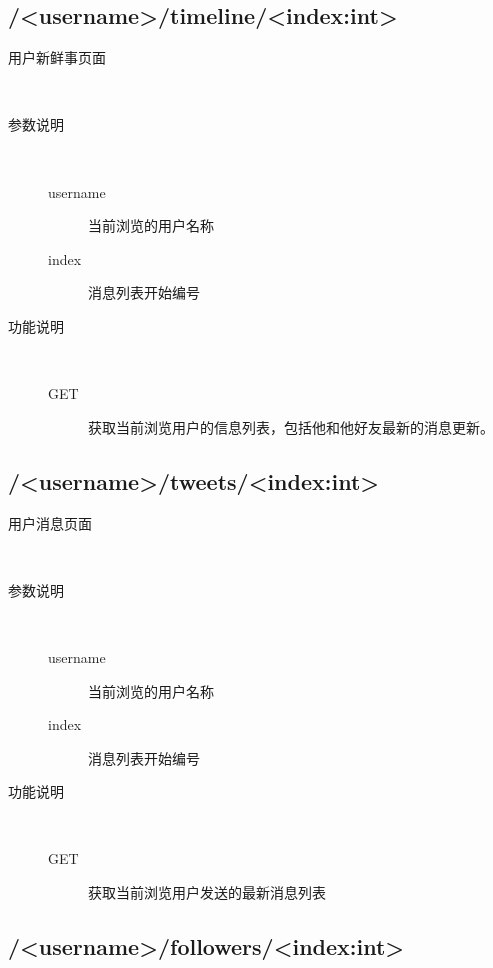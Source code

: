 \documentclass{yaldc}
\begin{document}
\subsection{/<username>/timeline/<index:int>}

\begin{description}
    \item[用户新鲜事页面] ~
    \item[参数说明] ~
        \begin{description}
            \item[username] 当前浏览的用户名称
            \item[index] 消息列表开始编号
        \end{description}
    \item[功能说明] ~
        \begin{description}
            \item[GET] 获取当前浏览用户的信息列表，包括他和他好友最新的消息更新。
        \end{description}
\end{description}

\subsection{/<username>/tweets/<index:int>}

\begin{description}
    \item[用户消息页面] ~
    \item[参数说明] ~
        \begin{description}
            \item[username] 当前浏览的用户名称
            \item[index] 消息列表开始编号
        \end{description}
    \item[功能说明] ~
        \begin{description}
            \item[GET] 获取当前浏览用户发送的最新消息列表
        \end{description}
\end{description}

\subsection{/<username>/followers/<index:int>}
\end{document}
